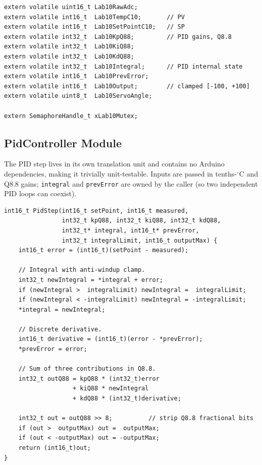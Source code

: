 \documentclass[12pt]{article}
\begin{document}
\begin{lstlisting}[caption={Lab10Sync.h --- shared volatile data and mutex}]
extern volatile uint16_t Lab10RawAdc;
extern volatile int16_t  Lab10TempC10;       // PV
extern volatile int16_t  Lab10SetPointC10;   // SP
extern volatile int32_t  Lab10KpQ88;         // PID gains, Q8.8
extern volatile int32_t  Lab10KiQ88;
extern volatile int32_t  Lab10KdQ88;
extern volatile int32_t  Lab10Integral;      // PID internal state
extern volatile int16_t  Lab10PrevError;
extern volatile int16_t  Lab10Output;        // clamped [-100, +100]
extern volatile uint8_t  Lab10ServoAngle;

extern SemaphoreHandle_t xLab10Mutex;
\end{lstlisting}

\subsection{PidController Module}

The PID step lives in its own translation unit and contains no Arduino dependencies, making it trivially unit-testable. Inputs are passed in tenths-$^{\circ}$C and Q8.8 gains; \texttt{integral} and \texttt{prevError} are owned by the caller (so two independent PID loops can coexist).

\begin{lstlisting}[caption={PidController.cpp --- the full PID step}]
int16_t PidStep(int16_t setPoint, int16_t measured,
                int32_t kpQ88, int32_t kiQ88, int32_t kdQ88,
                int32_t* integral, int16_t* prevError,
                int32_t integralLimit, int16_t outputMax) {
    int16_t error = (int16_t)(setPoint - measured);

    // Integral with anti-windup clamp.
    int32_t newIntegral = *integral + error;
    if (newIntegral >  integralLimit) newIntegral =  integralLimit;
    if (newIntegral < -integralLimit) newIntegral = -integralLimit;
    *integral = newIntegral;

    // Discrete derivative.
    int16_t derivative = (int16_t)(error - *prevError);
    *prevError = error;

    // Sum of three contributions in Q8.8.
    int32_t outQ88 = kpQ88 * (int32_t)error
                   + kiQ88 * newIntegral
                   + kdQ88 * (int32_t)derivative;

    int32_t out = outQ88 >> 8;          // strip Q8.8 fractional bits
    if (out >  outputMax) out =  outputMax;
    if (out < -outputMax) out = -outputMax;
    return (int16_t)out;
}
\end{lstlisting}
\end{document}
